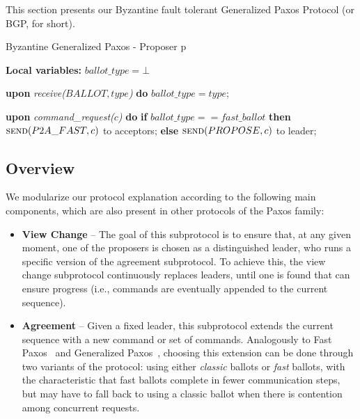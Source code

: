 
This section presents our Byzantine fault tolerant Generalized Paxos
Protocol (or BGP, for short). 

\begin{algorithm}
	\caption{Byzantine Generalized Paxos - Proposer p}
	\label{BFT-Prop}
	\textbf{Local variables:} $ballot\_type = \bot$
	\begin{algorithmic}[1]	
		
		\State \textbf{upon} \textit{receive($BALLOT, type$)} \textbf{do} 
		\State \hspace{\algorithmicindent} $ballot\_type = type$;
		\State
		
		\State \textbf{upon} \textit{command\_request($c$)} \textbf{do}   \hspace{\algorithmicindent}\hspace{\algorithmicindent}\hspace{\algorithmicindent}\hspace{\algorithmicindent}
		\State \hspace{\algorithmicindent} \textbf{if} $ballot\_type == fast\_ballot$ \textbf{then}
		\State \hspace{\algorithmicindent}\hspace{\algorithmicindent} $\Call{send}{P2A\_FAST, c}$ to acceptors;
		\State \hspace{\algorithmicindent} \textbf{else} 
		\State \hspace{\algorithmicindent}\hspace{\algorithmicindent} $\Call{send}{PROPOSE, c}$ to leader;		
	\end{algorithmic}
\end{algorithm}

\subsection{Overview}
We modularize our protocol explanation according to the following main components, which are also present in other protocols of the Paxos family:

\begin{itemize}
	
	\item
	{\bf View Change} -- The goal of this subprotocol is to ensure that, at any given moment, one of the proposers is chosen as a distinguished leader, who runs a specific version of the agreement subprotocol. To achieve this, the view change subprotocol continuously replaces leaders, until one is found that can ensure progress (i.e., commands are eventually appended to the current sequence).
	
	\item
	{\bf Agreement} -- Given a fixed leader, this subprotocol extends the current sequence with a new command or set of commands. Analogously to Fast Paxos~\cite{L06} and Generalized Paxos~\cite{Lamport2005}, choosing this extension can be done through two variants of the protocol: using either \textit{classic} ballots or \textit{fast} ballots, with the characteristic that fast ballots complete in fewer communication steps, but may have to fall back to using a classic ballot when there is contention among concurrent requests.
	
\end{itemize}

